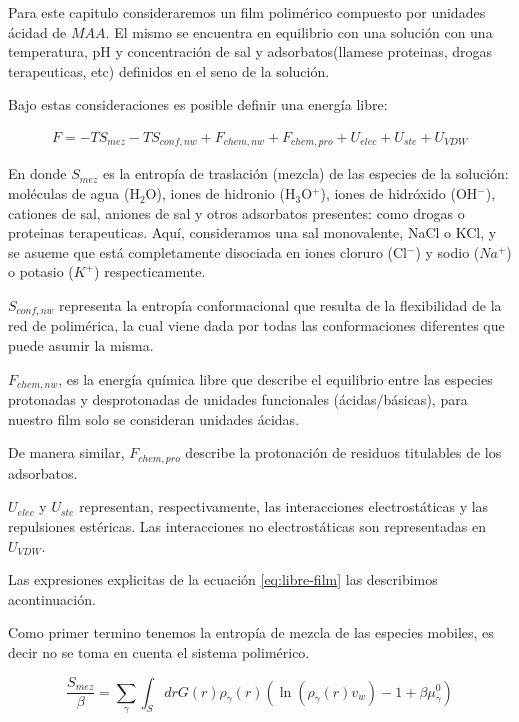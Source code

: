 Para este capitulo consideraremos un film polim\'erico compuesto por unidades \'acidad de $MAA$.
El mismo se encuentra en equilibrio con una soluci\'on con una temperatura, pH y concentraci\'on de sal y adsorbatos(llamese proteinas, drogas terapeuticas, etc) definidos en el seno de la soluci\'on.


Bajo estas consideraciones es posible definir una energ\'ia libre:

\begin{align}
 	F = -TS_{mez} -TS_{conf,nw} + F_{chem,nw} + F_{chem,pro} + U_{elec} + U_{ste} + U_{VDW}
 	\label{eq:libre-film}
\end{align}
 
\noindent En donde $S_{mez}$ es la entropía de traslación (mezcla) de las especies de la solución: moléculas de agua (H$_2$O), iones de hidronio (H$_3$O$^+$), iones de hidróxido (OH$^- $), cationes de sal, aniones de sal y otros adsorbatos presentes: como drogas o proteinas terapeuticas.
Aquí, consideramos una sal monovalente, NaCl o KCl, y se asueme que está completamente disociada en iones cloruro (Cl$^-$) y sodio ($Na^+$) o potasio ($K^+$) respecticamente. 

$S_{conf,nw}$ representa la entrop\'ia conformacional que resulta de la flexibilidad de la red de polim\'erica, la cual viene dada por todas las conformaciones diferentes que puede asumir la misma.

$F_{chem,nw}$, es la energ\'ia qu\'imica libre que describe el equilibrio entre las especies protonadas y desprotonadas de unidades funcionales (\'acidas/b\'asicas), para nuestro film solo se consideran unidades \'acidas.

De manera similar, $F_{chem,pro}$ describe la protonaci\'on de residuos titulables de los adsorbatos.

$U_{elec}$ y $U_{ste}$ representan, respectivamente, las interacciones electrost\'aticas y las repulsiones est\'ericas.
Las interacciones no electrost\'aticas son representadas en $U_{VDW}$.


Las expresiones explicitas de la ecuaci\'on \ref{eq:libre-film} las describimos acontinuaci\'on.

Como primer termino tenemos la entrop\'ia de mezcla de  las especies mobiles, es decir no se toma en cuenta el sistema polim\'erico.

\begin{equation}
\frac{S_{mez}}{\beta}= \sum_{\gamma}\int_S{dr G(r)\rho_\gamma(r)\left(\ln \left(\rho_\gamma (r)v_w\right) -1 + \beta\mu^0_\gamma\right)}
\end{equation}

